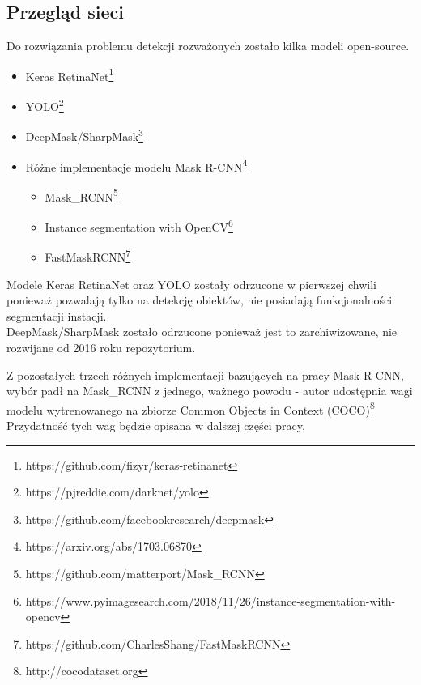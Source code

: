 \subsection{Przegląd sieci}

Do rozwiązania problemu detekcji rozważonych zostało kilka modeli open-source.

\begin{itemize}
	\item Keras RetinaNet\footnote{https://github.com/fizyr/keras-retinanet}
	\item YOLO\footnote{https://pjreddie.com/darknet/yolo}
	\item DeepMask/SharpMask\footnote{https://github.com/facebookresearch/deepmask}
	\item Różne implementacje modelu Mask R-CNN\footnote{https://arxiv.org/abs/1703.06870}
		\begin{itemize}
			\item Mask\_RCNN\footnote{https://github.com/matterport/Mask\_RCNN}
			\item Instance segmentation with OpenCV\footnote{https://www.pyimagesearch.com/2018/11/26/instance-segmentation-with-opencv}
			\item FastMaskRCNN\footnote{https://github.com/CharlesShang/FastMaskRCNN}
		\end{itemize}
\end{itemize}

Modele Keras RetinaNet oraz YOLO zostały odrzucone w pierwszej chwili ponieważ pozwalają tylko na detekcję obiektów, nie posiadają funkcjonalności segmentacji instacji. \\

DeepMask/SharpMask zostało odrzucone ponieważ jest to zarchiwizowane, nie rozwijane od 2016 roku repozytorium.

Z pozostałych trzech różnych implementacji bazujących na pracy Mask R-CNN, wybór padł na Mask\_RCNN z jednego, ważnego powodu - autor udostępnia wagi modelu wytrenowanego na zbiorze Common Objects in Context (COCO)\footnote{http://cocodataset.org} Przydatność tych wag będzie opisana w dalszej części pracy.